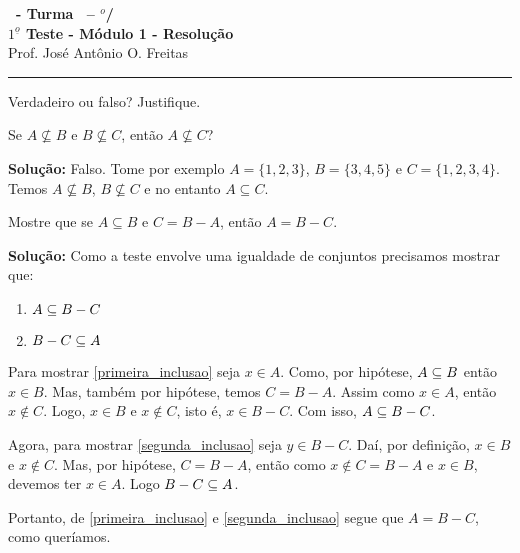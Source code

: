 \documentclass[12pt]{exam}
\begin{document}
\begin{center}
{\Large\bf \disciplina\ - Turma \turma\ -- \semestre$^{o}$/\ano} \\ \vspace{9pt} {\large\bf
$1^{\underline{o}}$ Teste - Módulo 1 - Resolu\c{c}\~ao}\\
\vspace{9pt} Prof. Jos{\'e} Ant{\^o}nio O. Freitas
\end{center}
\hrule

\vspace{.6cm}


\vspace{.6cm}

\questao Verdadeiro ou falso? Justifique.
\begin{center}
    Se $A \nsubseteq B$ e $B \nsubseteq C$, ent\~ao $A \nsubseteq C$?
\end{center}

\noindent\textbf{Solu\c{c}\~ao:} Falso. Tome por exemplo $A = \{1, 2, 3\}$, $B = \{3, 4, 5\}$ e $C = \{1, 2, 3, 4\}$. Temos $A \nsubseteq B$, $B \nsubseteq C$ e no entanto $A \subseteq C$.

\vspace{.5cm}

\questao Mostre que se $A \subseteq B$ e $C = B - A$, ent\~ao $A = B - C$.

\noindent\textbf{Solu\c{c}\~ao:} Como a teste envolve uma igualdade de conjuntos precisamos mostrar que:
\begin{enumerate}[label=({\roman*})]
    \item $A \subseteq B - C$\label{primeira_inclusao}
    \item $B - C \subseteq A$\label{segunda_inclusao}
\end{enumerate}

Para mostrar \ref{primeira_inclusao} seja $x \in A$. Como, por hipótese, $A \subseteq B$ então $x \in B$. Mas, também por hipótese, temos $C = B - A$. Assim como $x \in A$, então $x \notin C$. Logo, $x \in B$ e $x \notin C$, isto é, $x \in B - C$. Com isso, $A \subseteq B - C$.

Agora, para mostrar \ref{segunda_inclusao} seja $y \in B - C$. Daí, por definição, $x \in B$ e $x \notin C$. Mas, por hipótese, $C = B - A$, então como $x \notin C = B - A$ e $x \in B$, devemos ter $x \in A$. Logo $B - C \subseteq A$.

Portanto, de \ref{primeira_inclusao} e \ref{segunda_inclusao} segue que $A = B - C$, como queríamos.
\end{document}

